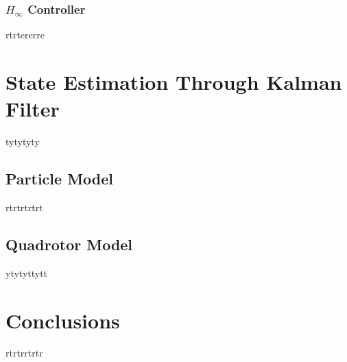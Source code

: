 \subsubsection{$H_\infty$ Controller}
rtrtererre


\section{State Estimation Through Kalman Filter}
tytytyty

\subsection{Particle Model}
rtrtrtrtrt

\subsection{Quadrotor Model}
ytytyttytt

\section{Conclusions}
rtrtrrtrtr